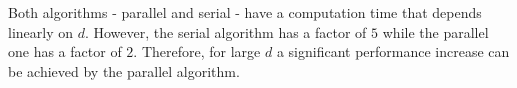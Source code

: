\documentclass{article}
\begin{document}
\begin{enumerate}[label=(\alph*)]
    Both algorithms - parallel and serial - have a computation time that depends linearly on $d$. However, the serial algorithm has a factor of $5$ while the parallel one has a factor of $2$. Therefore, for large $d$ a significant performance increase can be achieved by the parallel algorithm.
\end{enumerate}



\end{document}
